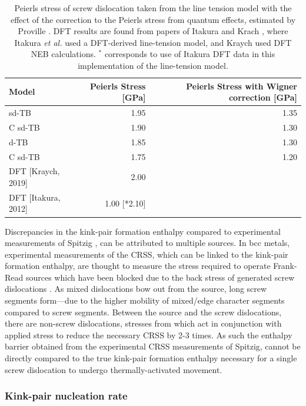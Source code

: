 \documentclass[a4paper,11pt]{article}
\begin{document}
\begin{table}[htbp]
\caption{Peierls stress of screw dislocation taken from the line tension model with the effect of the correction to the Peierls stress from quantum effects, estimated by Proville \cite{Proville2012}. DFT results are found from papers of Itakura and Krach \cite{Itakura2012,Kraych2019}, where Itakura \emph{et al.} used a DFT-derived line-tension model, and Kraych used DFT NEB calculations. \(^{*}\) corresponds to use of Itakura DFT data in this implementation of the line-tension model.  \label{wignercorrection}}
\centering
\begin{tabular}{lrr}
Model & Peierls Stress [GPa] & Peierls Stress with Wigner correction [GPa]\\
\hline
sd-TB & 1.95 & 1.35\\
C sd-TB & 1.90 & 1.30\\
\hline
d-TB & 1.85 & 1.30\\
C sd-TB & 1.75 & 1.20\\
\hline
DFT [Kraych, 2019] & 2.00 & \\
DFT [Itakura, 2012] & 1.00 [*2.10] & \\
\end{tabular}
\end{table}



Discrepancies in the kink-pair formation enthalpy compared to experimental
measurements of Spitzig \cite{Spitzig_1970}, can be attributed to multiple
sources. In bcc metals, experimental measurements of the CRSS, which can be
linked to the kink-pair formation enthalpy, are thought to measure the
stress required to operate Frank-Read sources which have been blocked due to
the back stress of generated screw dislocations \cite{Groger2007}. As mixed
dislocations bow out from the source, long screw segments form---due to the
higher mobility of mixed/edge character segments compared to screw
segments. Between the source and the screw dislocations, there are non-screw
dislocations, stresses from which act in conjunction with applied stress to
reduce the necessary CRSS by 2-3 times. As such the enthalpy barrier
obtained from the experimental CRSS measurements of Spitzig, cannot be
directly compared to the true kink-pair formation enthalpy necessary for a
single screw dislocation to undergo thermally-activated movement.

\subsubsection{Kink-pair nucleation rate}
\label{sec:orgfcfd902}
\label{sec:kink-pair_nucleation_rate}
\end{document}
